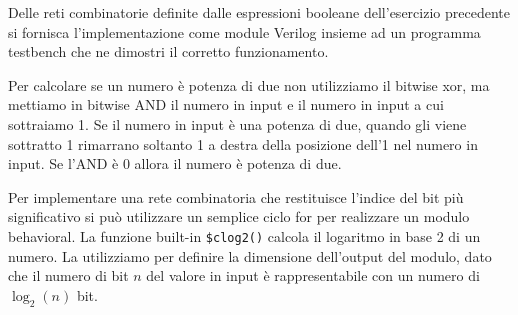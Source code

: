 \begin{exrc}
	Delle reti combinatorie definite dalle espressioni booleane dell’esercizio
	precedente si fornisca l’implementazione come module Verilog insieme ad un
	programma testbench che ne dimostri il corretto funzionamento.

	Per calcolare se un numero è potenza di due non utilizziamo il bitwise xor,
	ma mettiamo in bitwise AND il numero in input e il numero in input a cui
	sottraiamo 1. Se il numero in input è una potenza di due, quando gli viene
	sottratto 1 rimarrano soltanto 1 a destra della posizione dell'1 nel numero
	in input. Se l'AND è 0 allora il numero è potenza di due.




	Per implementare una rete combinatoria che restituisce l'indice del bit più
	significativo si può utilizzare un semplice ciclo for per realizzare un
	modulo behavioral. La funzione built-in \texttt{\$clog2()} calcola il
	logaritmo in base 2 di un numero. La utilizziamo per definire la dimensione
	dell'output del modulo, dato che il numero di bit $ n $ del valore in input
	è rappresentabile con un numero di $ \log_2(n) $ bit.
	


	
\end{exrc}

